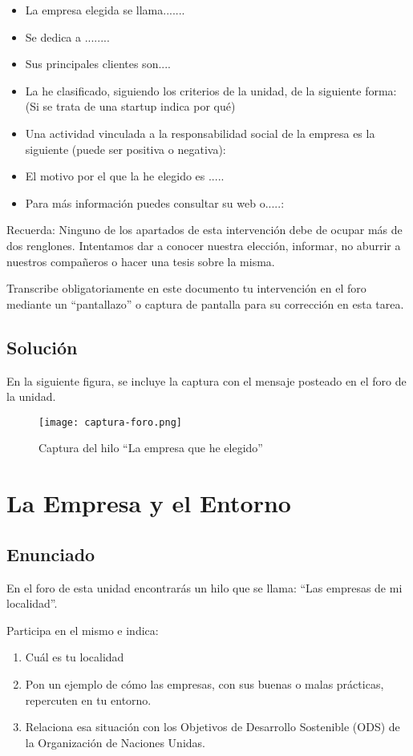 \begin{itemize}
    \item La empresa elegida se llama.......
    \item Se dedica a ........
    \item Sus principales clientes son....
    \item La he clasificado, siguiendo los criterios de la unidad, de la siguiente forma:  (Si se trata de una startup indica por qué)
    \item Una actividad vinculada a la responsabilidad social de la empresa es la siguiente (puede ser positiva o negativa):
    \item El motivo por el que la he elegido es .....
    \item Para más información puedes consultar su web o.....:
\end{itemize}

Recuerda: Ninguno de los apartados de esta intervención debe de ocupar más de dos renglones. Intentamos dar a conocer nuestra elección, informar, no aburrir a nuestros compañeros o hacer una tesis sobre la misma.

Transcribe obligatoriamente en este documento tu intervención en el foro mediante un “pantallazo” o captura de pantalla para su corrección en esta tarea.

\subsection{Solución}
En la siguiente figura, se incluye la captura con el mensaje posteado en el foro de la unidad.

\begin{figure}[H]
    \centering
    \texttt{[image: captura-foro.png]}
    \caption{Captura del hilo ``La empresa que he elegido''}
\end{figure}

\section{La Empresa y el Entorno}

\subsection{Enunciado}
En el foro de esta unidad encontrarás un hilo que se llama: “Las empresas de mi localidad”.

Participa en el mismo e indica:

\begin{enumerate}
    \item Cuál es tu localidad
    \item Pon un ejemplo de cómo las empresas, con sus buenas o malas prácticas, repercuten en tu entorno.
    \item Relaciona esa situación con los Objetivos de Desarrollo Sostenible (ODS) de la Organización de Naciones Unidas.
\end{enumerate}

